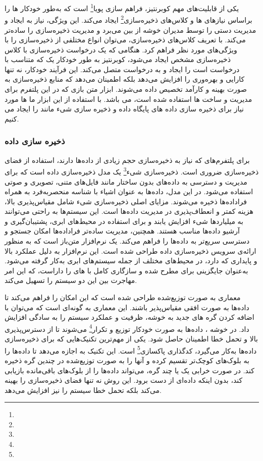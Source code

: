 یکی از قابلیت‌های مهم کوبرنتیز، فراهم سازی پویا\footnote{} است که به‌طور خودکار ها را براساس نیازهای ها و کلاس‌های ذخیره‌سازی\footnote{} ایجاد می‌کند. این ویژگی، نیاز به ایجاد و مدیریت دستی  را توسط مدیران خوشه از بین می‌برد و مدیریت ذخیره‌سازی را ساده‌تر می‌کند. با تعریف کلاس‌های ذخیره‌سازی، می‌توان انواع مختلفی از ذخیره‌سازی را با ویژگی‌های مورد نظر فراهم کرد. هنگامی که یک درخواست ذخیره‌سازی  با کلاس ذخیره‌سازی مشخص ایجاد می‌شود، کوبرنتیز به طور خودکار یک  که متناسب با درخواست است را ایجاد و به درخواست متصل می‌کند. این فرآیند خودکار، نه تنها کارایی و بهره‌وری را افزایش می‌دهد بلکه اطمینان می‌دهد که منابع ذخیره‌سازی به صورت بهینه و کارآمد تخصیص داده می‌شوند. ابزار متن بازی که در این پلتفرم برای مدیریت و ساخت ها استفاده شده است،  می باشد. با استفاده از این ابزار ما ها مورد نیاز برای ذخیره سازی داده های پایگاه داده و ذخیره سازی شیء مانند  را ایجاد می کنیم.

\subsubsection{ذخیره سازی داده}
برای پلتفرم‌های  که نیاز به ذخیره‌سازی حجم زیادی از داده‌ها دارند، استفاده از فضای ذخیره‌سازی ضروری است. ذخیره‌سازی شیء\footnote{} یک مدل ذخیره‌سازی داده‌ است که برای مدیریت و دسترسی به داده‌های بدون ساختار مانند فایل‌های متنی، تصویری و صوتی استفاده می‌شود. در این مدل، داده‌ها به عنوان اشیاء با شناسه منحصربه‌فرد به همراه فراداده‌ها ذخیره می‌شوند. مزایای اصلی ذخیره‌سازی شیء شامل مقیاس‌پذیری بالا، هزینه کمتر و انعطاف‌پذیری در مدیریت داده‌ها است. این سیستم‌ها به راحتی می‌توانند به میلیاردها شیء افزایش یابند و برای استفاده در محیط‌های ابری، پشتیبان‌گیری و آرشیو داده‌ها مناسب هستند. همچنین، مدیریت ساده‌تر فراداده‌ها امکان جستجو و دسترسی سریع‌تر به داده‌ها را فراهم می‌کند.  یک نرم‌افزار متن‌باز است که به منظور ارائه‌ی سرویس ذخیره‌سازی داده طراحی شده است. این نرم‌افزار به دلیل عملکرد بالا و پایداری که دارد، در محیط‌های مختلف از جمله سیستم‌های ابری به‌کار گرفته می‌شود.  به‌عنوان جایگزینی برای  مطرح شده و سازگاری کامل با های  را داراست، که این امر مهاجرت بین این دو سیستم را تسهیل می‌کند.

معماری  به صورت توزیع‌شده طراحی شده است که این امکان را فراهم می‌کند تا داده‌ها به صورت افقی مقیاس‌پذیر باشند. این معماری به گونه‌ای است که می‌توان با اضافه کردن گره های جدید به خوشه، ظرفیت و عملکرد سیستم را به سادگی افزایش داد. در خوشه ، داده‌ها به صورت خودکار توزیع و تکرار\footnote{} می‌شوند تا از دسترس‌پذیری بالا و تحمل خطا اطمینان حاصل شود. یکی از مهم‌ترین تکنیک‌هایی که  برای ذخیره‌سازی داده‌ها به‌کار می‌گیرد، کدگذاری پاکسازی\footnote{} است. این تکنیک به  اجازه می‌دهد تا داده‌ها را به بلوک‌های کوچک‌تر تقسیم کرده و آنها را به صورت توزیع‌شده در چندین گره ذخیره کند. در صورت خرابی یک یا چند گره،  می‌تواند داده‌ها را از بلوک‌های باقی‌مانده بازیابی کند، بدون اینکه داده‌ای از دست برود. این روش نه تنها فضای ذخیره‌سازی را بهینه می‌کند بلکه تحمل خطا سیستم را نیز افزایش می‌دهد. 

